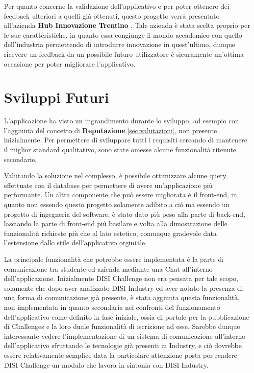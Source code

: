 Per quanto concerne la validazione dell'applicativo e per poter ottenere dei feedback ulteriori a quelli già ottenuti, questo progetto verrà presentato all'azienda \textbf{Hub Innovazione Trentino} \cite{HiT}. Tale azienda è stata scelta proprio per le sue caratteristiche, in quanto essa congiunge il mondo accademico con quello dell'industria permettendo di introdurre innovazione in quest'ultimo, dunque ricevere un feedback da un possibile futuro utilizzatore è sicuramente un'ottima occasione per poter migliorare l'applicativo.


\section{Sviluppi Futuri}
L'applicazione ha visto un ingrandimento durante lo sviluppo, ad esempio con l'aggiunta del concetto di \textbf{Reputazione} \ref{sec:valutazioni}, non presente inizialmente. Per permettere di sviluppare tutti i requisiti cercando di mantenere il miglior standard qualitativo, sono state omesse alcune funzionalità ritenute secondarie.

Valutando la soluzione nel complesso, è possibile ottimizzare alcune query effettuate con il database per permettere di avere un'applicazione più performante. Un altra componente che può essere migliorata è il front-end, in quanto non essendo questo progetto solamente adibito a ciò ma essendo un progetto di ingegneria del software, è stato dato più peso alla parte di back-end, lasciando la parte di front-end più basilare e volta alla dimostrazione delle funzionalità richieste più che al lato estetico, comunque gradevole data l'estensione dallo stile dell'applicativo orginiale.


La principale funzionalità che potrebbe essere implementata è la parte di comunicazione tra studente ed azienda mediante una Chat all'interno dell'applicazione. Inizialmente DISI Challenge non era pensata per tale scopo, solamente che dopo aver analizzato DISI Industry ed aver notato la presenza di una forma di comunicazione già presente, è stata aggiunta questa funzionalità, non implementata in quanto secondaria nei confronti del funzionamento dell'applicativo come definito in fase iniziale, ossia di portale per la pubblicazione di Challenges e la loro duale funzionalità di iscrizione ad esse. Sarebbe dunque interessante vedere l'implementazione di un sistema di comunicazione all'interno dell'applicativo sfruttando le tecnologie già presenti in Industry, e ciò dovrebbe essere relativamente semplice data la particolare attenzione posta per rendere DISI Challenge un modulo che lavora in sintonia con DISI Industry.

